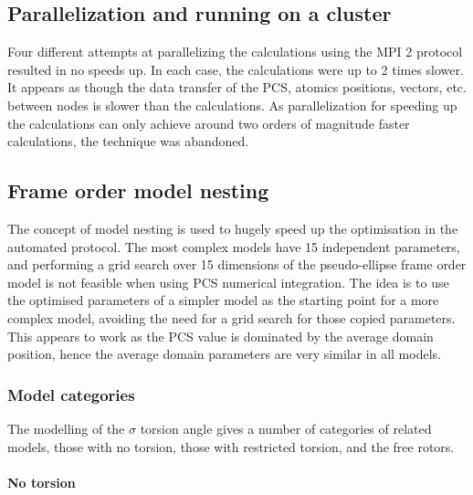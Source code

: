 
\subsection{Parallelization and running on a cluster}

Four different attempts at parallelizing the calculations using the MPI 2 protocol resulted in no speeds up.
In each case, the calculations were up to 2 times slower.
It appears as though the data transfer of the PCS, atomics positions, vectors, etc. between nodes is slower than the calculations.
As parallelization for speeding up the calculations can only achieve around two orders of magnitude faster calculations, the technique was abandoned.





\subsection{Frame order model nesting}

The concept of model nesting is used to hugely speed up the optimisation in the automated protocol.
The most complex models have 15 independent parameters, and performing a grid search over 15 dimensions of the pseudo-ellipse frame order model is not feasible when using PCS numerical integration.
The idea is to use the optimised parameters of a simpler model as the starting point for a more complex model, avoiding the need for a grid search for those copied parameters.
This appears to work as the PCS value is dominated by the average domain position, hence the average domain parameters are very similar in all models.


\subsubsection{Model categories}

The modelling of the $\sigma$ torsion angle gives a number of categories of related models, those with no torsion, those with restricted torsion, and the free rotors.


\paragraph{No torsion}


